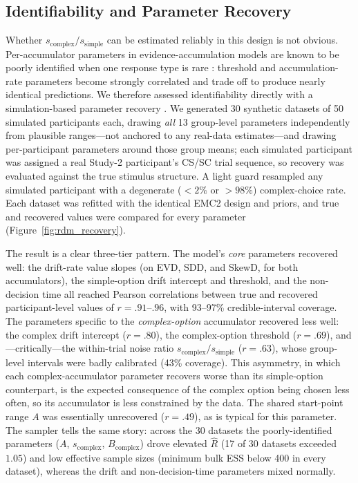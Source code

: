 \documentclass[man,floatsintext]{apa7}
\begin{document}
\subsection{Identifiability and Parameter Recovery}

Whether $s_{\text{complex}} / s_{\text{simple}}$ can be estimated reliably in this design is not obvious. Per-accumulator parameters in evidence-accumulation models are known to be poorly identified when one response type is rare \parencite{luken_parameter_2024}: threshold and accumulation-rate parameters become strongly correlated and trade off to produce nearly identical predictions. We therefore assessed identifiability directly with a simulation-based parameter recovery \parencite[following][]{baribault_troubleshooting_2025}. We generated 30 synthetic datasets of 50 simulated participants each, drawing \emph{all} 13 group-level parameters independently from plausible ranges---not anchored to any real-data estimates---and drawing per-participant parameters around those group means; each simulated participant was assigned a real Study-2 participant's CS/SC trial sequence, so recovery was evaluated against the true stimulus structure. A light guard resampled any simulated participant with a degenerate ($<2\%$ or $>98\%$) complex-choice rate. Each dataset was refitted with the identical EMC2 design and priors, and true and recovered values were compared for every parameter (Figure~\ref{fig:rdm_recovery}).

The result is a clear three-tier pattern. The model's \emph{core} parameters recovered well: the drift-rate value slopes (on EVD, SDD, and SkewD, for both accumulators), the simple-option drift intercept and threshold, and the non-decision time all reached Pearson correlations between true and recovered participant-level values of $r = .91$--$.96$, with 93--97\% credible-interval coverage. The parameters specific to the \emph{complex-option} accumulator recovered less well: the complex drift intercept ($r = .80$), the complex-option threshold ($r = .69$), and---critically---the within-trial noise ratio $s_{\text{complex}} / s_{\text{simple}}$ ($r = .63$), whose group-level intervals were badly calibrated (43\% coverage). This asymmetry, in which each complex-accumulator parameter recovers worse than its simple-option counterpart, is the expected consequence of the complex option being chosen less often, so its accumulator is less constrained by the data. The shared start-point range $A$ was essentially unrecovered ($r = .49$), as is typical for this parameter. The sampler tells the same story: across the 30 datasets the poorly-identified parameters ($A$, $s_{\text{complex}}$, $B_{\text{complex}}$) drove elevated $\hat{R}$ (17 of 30 datasets exceeded $1.05$) and low effective sample sizes (minimum bulk ESS below 400 in every dataset), whereas the drift and non-decision-time parameters mixed normally.
\end{document}
